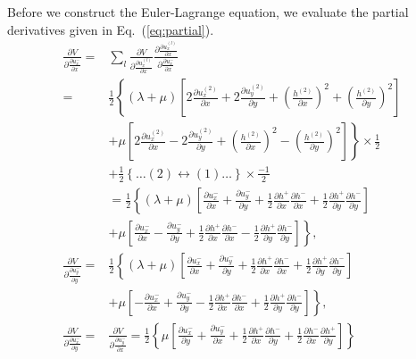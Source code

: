 \documentclass[aps,prx,10pt,twocolumn,superscriptaddress]{revtex4}
\begin{document}
\begin{widetext}
Before we construct the Euler-Lagrange equation, we evaluate the partial derivatives given in Eq.~(\ref{eq:partial}).
\allowdisplaybreaks
\begin{align}\label{eq:partialde}
\frac{\partial V}{\partial \frac{\partial u^{-}_{x}}{\partial x}}=&\sum_{l}\frac{\partial V}{\partial \frac{\partial u^{(l)}_{x}}{\partial x}}\frac{\partial \frac{\partial u^{(l)}_{x}}{\partial x}}{\partial \frac{\partial u^{-}_{x}}{\partial x}}\nonumber\\
=&\frac{1}{2}\left\{ (\lambda+\mu)\left[2\frac{\partial u^{(2)}_{x}}{\partial x}+2\frac{\partial u^{(2)}_{y}}{\partial y}+\left(\frac{h^{(2)}}{\partial x}\right)^{2}+\left(\frac{h^{(2)}}{\partial y}\right)^{2}\right] \right.\nonumber\\
&\left.+\mu\left[2\frac{\partial u^{(2)}_{x}}{\partial x}-2\frac{\partial u^{(2)}_{y}}{\partial y}+\left(\frac{h^{(2)}}{\partial x}\right)^{2}-\left(\frac{h^{(2)}}{\partial y}\right)^{2}\right]\right\}\times\frac{1}{2}\nonumber\\
&+ \frac{1}{2} \left\{ \dots (2)\leftrightarrow(1)\dots \right\}\times\frac{-1}{2}\nonumber\\
&=\frac{1}{2}\left\{(\lambda+\mu)\left[ \frac{\partial u^{-}_{x}}{\partial x}+\frac{\partial u^{-}_{y}}{\partial y}+\frac{1}{2}\frac{\partial h^{+}}{\partial x}\frac{\partial h^{-}}{\partial x}+\frac{1}{2}\frac{\partial h^{+}}{\partial y}\frac{\partial h^{-}}{\partial y} \right]\right.\nonumber\\
&\left.+\mu\left[ \frac{\partial u^{-}_{x}}{\partial x}-\frac{\partial u^{-}_{y}}{\partial y}+\frac{1}{2}\frac{\partial h^{+}}{\partial x}\frac{\partial h^{-}}{\partial x}-\frac{1}{2}\frac{\partial h^{+}}{\partial y}\frac{\partial h^{-}}{\partial y} \right]\right\},\nonumber\\
\frac{\partial V}{\partial \frac{\partial u^{-}_{y}}{\partial y}}=&\frac{1}{2}\left\{(\lambda+\mu)\left[ \frac{\partial u^{-}_{x}}{\partial x}+\frac{\partial u^{-}_{y}}{\partial y}+\frac{1}{2}\frac{\partial h^{+}}{\partial x}\frac{\partial h^{-}}{\partial x}+\frac{1}{2}\frac{\partial h^{+}}{\partial y}\frac{\partial h^{-}}{\partial y} \right]\right.\nonumber\\
&\left.+\mu\left[- \frac{\partial u^{-}_{x}}{\partial x}+\frac{\partial u^{-}_{y}}{\partial y}-\frac{1}{2}\frac{\partial h^{+}}{\partial x}\frac{\partial h^{-}}{\partial x}+\frac{1}{2}\frac{\partial h^{+}}{\partial y}\frac{\partial h^{-}}{\partial y} \right]\right\},\nonumber\\
\frac{\partial V}{\partial \frac{\partial u^{-}_{x}}{\partial y}}=&\frac{\partial V}{\partial \frac{\partial u^{-}_{y}}{\partial x}}=\frac{1}{2}\left\{ \mu\left[ \frac{\partial u^{-}_{x}}{\partial y}+\frac{\partial u^{-}_{y}}{\partial x}+\frac{1}{2}\frac{\partial h^{+}}{\partial x}\frac{\partial h^{-}}{\partial y}+\frac{1}{2}\frac{\partial h^{-}}{\partial x}\frac{\partial h^{+}}{\partial y} \right] \right\}\nonumber\\

\end{align}
\end{widetext}
\end{document}
